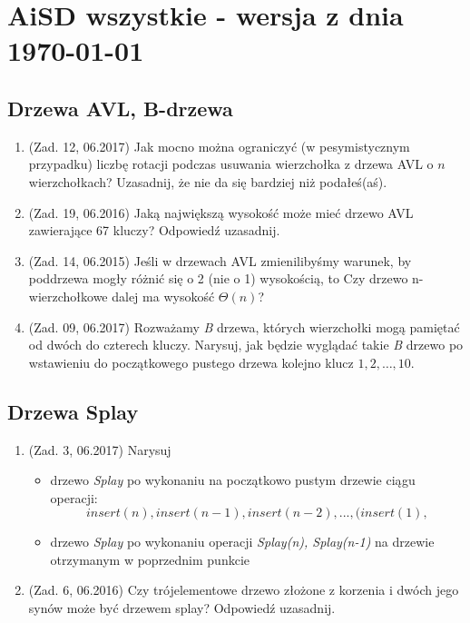 \documentclass[10pt]{article}%
\begin{document}
\section*{AiSD wszystkie - wersja z dnia \today}


\subsection*{Drzewa AVL, B-drzewa}
\begin{enumerate}
\item (Zad. 12, 06.2017) Jak mocno można ograniczyć (w pesymistycznym przypadku) liczbę rotacji podczas usuwania wierzchołka z drzewa AVL o $n$ wierzchołkach? Uzasadnij, że nie da się bardziej niż podałeś(aś).

\item (Zad. 19, 06.2016) Jaką największą wysokość może mieć drzewo AVL zawierające 67 kluczy? Odpowiedź uzasadnij.

\item (Zad. 14, 06.2015) Jeśli w drzewach AVL zmienilibyśmy warunek, by poddrzewa mogły różnić się o 2 (nie o 1) wysokością, to Czy drzewo n-wierzchołkowe dalej ma wysokość $\Theta(n)$?

\item (Zad. 09, 06.2017) Rozważamy \emph{B} drzewa, których wierzchołki mogą pamiętać od dwóch do czterech kluczy. Narysuj, jak będzie wyglądać takie \emph{B} drzewo po wstawieniu do początkowego pustego drzewa kolejno klucz $1,2,\ldots,10$.
\end{enumerate}
\subsection*{Drzewa Splay}
\begin{enumerate}
\item (Zad. 3, 06.2017) Narysuj 
\begin{itemize}
\item drzewo \emph{Splay} po wykonaniu na początkowo pustym drzewie ciągu operacji:
 $$insert(n),insert(n-1),insert(n-2),...,(insert(1),$$
 \item drzewo \emph{Splay} po wykonaniu operacji \emph{Splay(n), Splay(n-1)} na drzewie otrzymanym w poprzednim punkcie
 \end{itemize}

\item (Zad. 6, 06.2016) Czy trójelementowe drzewo złożone z korzenia i dwóch jego synów może być drzewem splay? Odpowiedź uzasadnij.
\end{enumerate}
\end{document}
